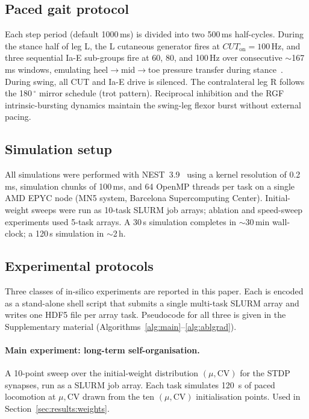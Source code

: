 \subsection{Paced gait protocol}\label{sec:methods:paced}
Each step period (default 1000\,ms) is divided
into two 500\,ms half-cycles. During the stance half of leg L, the L
cutaneous generator fires at $CUT_{\text{on}}=100$\,Hz, and three
sequential Ia-E sub-groups fire at 60, 80, and 100\,Hz over consecutive
$\sim$167\,ms windows, emulating heel$\to$mid$\to$toe pressure transfer
during stance~\cite{loebDuysens2018}. During swing, all CUT and Ia-E
drive is silenced. The contralateral leg R follows the 180\,$^{\circ}$
mirror schedule (trot pattern). Reciprocal inhibition and the RGF
intrinsic-bursting dynamics maintain the swing-leg flexor burst without
external pacing.

\subsection{Simulation setup}\label{sec:methods:sim}
All simulations were performed with NEST~3.9~\cite{nest2002} using a
kernel resolution of 0.2\,ms, simulation chunks of 100\,ms, and 64
OpenMP threads per task on a single AMD EPYC node (MN5 system,
Barcelona Supercomputing Center). Initial-weight sweeps were run as
10-task SLURM job arrays; ablation and speed-sweep experiments used
5-task arrays. A 30\,s simulation completes in $\sim$30\,min wall-clock;
a 120\,s simulation in $\sim$2\,h.

\subsection{Experimental protocols}\label{sec:methods:protocols}
Three classes of in-silico experiments are reported in this paper. Each
is encoded as a stand-alone shell script that submits a single
multi-task SLURM array and writes one HDF5 file per array task.
Pseudocode for all three is given in the Supplementary material (Algorithms~\ref{alg:main}--\ref{alg:ablgrad}).

\paragraph{Main experiment: long-term self-organisation.}
A 10-point sweep over the initial-weight distribution $(\mu,\mathrm{CV})$
for the STDP synapses, run as a SLURM job array. Each task simulates
\SI{120}{\second} of paced locomotion at $\mu, \mathrm{CV}$ drawn from
the ten $(\mu,\mathrm{CV})$ initialisation points. Used in Section~\ref{sec:results:weights}.


